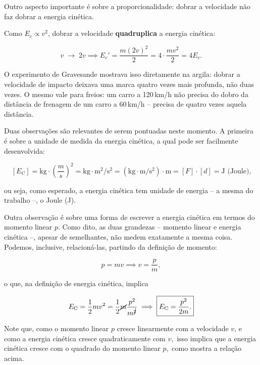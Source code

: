 Outro aspecto importante é sobre a proporcionalidade: dobrar a velocidade não faz dobrar a energia cinética.
 
Como $E_c \propto v^2$, dobrar a velocidade \textbf{quadruplica} a energia cinética:
 
\[
    v \;\to\; 2v
    \implies
    E_c' = \frac{m(2v)^2}{2} = 4\cdot\frac{mv^2}{2} = 4E_c.
\]
 
O experimento de Gravesande mostrava isso diretamente na argila: dobrar a velocidade de impacto deixava uma marca quatro vezes mais profunda, não duas vezes. O mesmo vale para freios: um carro a 120\,km/h não precisa do dobro da distância de
frenagem de um carro a 60\,km/h -- precisa de quatro vezes aquela distância.









Duas observações são relevantes de serem pontuadas neste momento. A primeira é sobre a unidade de medida da energia cinética, a qual pode ser facilmente desenvolvida:

$$ [E_\text{C}] = \text{kg} \cdot \left( \dfrac{m}{s} \right)^2 = \text{kg} \cdot \text{m}^2/\text{s}^2 = (\text{kg} \cdot \text{m}/\text{s}^2) \cdot \text{m} = [F] \cdot [d] = \text{J (Joule),}$$


\noindent ou seja, como esperado, a energia cinética tem unidade de energia -- a mesma do trabalho --, o Joule (J).

Outra observação é sobre uma forma de escrever a energia cinética em termos do momento linear $p.$ Como dito, as duas grandezas -- momento linear e energia cinética --, apesar de semelhantes, não medem exatamente a mesma coisa. Podemos, inclusive, relacioná-las, partindo da definição de momento:

$$ p = mv \implies v = \dfrac{p}{m},$$

\noindent o que, na definição de energia cinética, implica

$$ E_\text{C} = \dfrac{1}{2} mv^2 = \dfrac{1}{2} \cancel m \dfrac{p^2}{m^{\cancel{2}}} \implies \boxed{E_\text{C} = \dfrac{p^2}{2m}.}$$


Note que, como o momento linear $p$ cresce linearmente com a velocidade $v$, e como a energia cinética cresce quadraticamente com $v,$ isso implica que a energia cinética cresce com o quadrado do momento linear $p,$ como mostra a relação acima.




\vspace{0.3cm}

